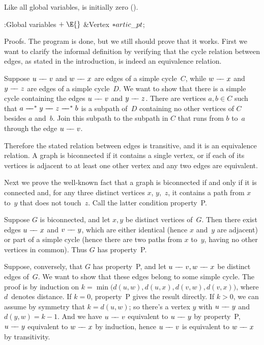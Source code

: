 Like all global variables,  is initially zero (\PB{$%
\NULL$}).

\Y\B\4:Global variables\X${}\mathrel+\E{}$\6
\&{Vertex} ${}{*}\\{artic\_pt}{}$;\par
\fi

Proofs.
The program is done, but we still should prove that it works.
First we want to clarify the informal definition by verifying that
the cycle relation between edges, as stated in the introduction, is indeed an
equivalence relation.

\def\dash{\mathrel-\joinrel\joinrel\mathrel-}
Suppose $u\dash v$ and $w\dash x$ are edges of a simple cycle~$C$, while
$w\dash x$ and $y\dash z$ are edges of a simple cycle~$D$. We want to show
that there is a simple cycle containing the edges $u\dash v$ and $y\dash z$.
There are vertices $a,b\in C$ such that $a\dash^\ast y\dash z\dash^\ast b$
is a subpath of~$D$ containing no other vertices of $C$ besides $a$ and~$b$.
Join this subpath to the subpath in $C$ that runs from $b$ to~$a$ through
the edge $u\dash v$.

Therefore the stated relation between edges is transitive, and it is
an equivalence relation.
A graph is biconnected if it contains a single vertex, or if each of
its vertices is adjacent to at least one other vertex and any two edges are
equivalent.

\fi

Next we prove the well-known fact that a graph is biconnected if and
only if it is connected and, for any three distinct vertices $x$,
$y$,~$z$, it contains a path from $x$ to~$y$ that does not touch~$z$.
Call the latter condition property~P.

Suppose $G$ is biconnected, and let $x,y$ be distinct vertices of~$G$.
Then there exist edges $u\dash x$ and $v\dash y$, which are either
identical (hence $x$ and~$y$ are adjacent) or part of a simple cycle
(hence there are two paths from $x$ to~$y$, having no other vertices in
common). Thus $G$ has property~P.

Suppose, conversely, that $G$ has property~P, and let $u\dash v,
w\dash x$ be distinct edges of~$G$. We want to show that these edges
belong to some simple cycle. The proof is by induction on
$k=\min\bigl(d(u,w),d(u,x),\allowbreak d(v,w),d(v,x)\bigr)$, where $d$~denotes
distance. If $k=0$, property~P gives the result directly. If $k>0$,
we can assume by symmetry that $k=d(u,w)$; so there's a vertex $y$
with $u\dash y$ and $d(y,w)=k-1$. And we have $u\dash v$ equivalent to
$u\dash y$ by property~P, $u\dash y$ equivalent to $w\dash x$ by induction,
hence $u\dash v$ is equivalent to $w\dash x$ by transitivity.

